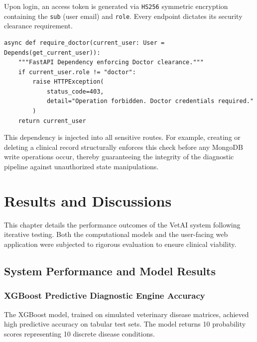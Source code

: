 \documentclass[a4paper,12pt]{report}
\begin{document}
Upon login, an access token is generated via \texttt{HS256} symmetric encryption containing the \texttt{sub} (user email) and \texttt{role}. Every endpoint dictates its security clearance requirement.

\begin{lstlisting}[caption={JWT Dependency Verification Example}]
async def require_doctor(current_user: User = Depends(get_current_user)):
    """FastAPI Dependency enforcing Doctor clearance."""
    if current_user.role != "doctor":
        raise HTTPException(
            status_code=403, 
            detail="Operation forbidden. Doctor credentials required."
        )
    return current_user
\end{lstlisting}

This dependency is injected into all sensitive routes. For example, creating or deleting a clinical record structurally enforces this check before any MongoDB write operations occur, thereby guaranteeing the integrity of the diagnostic pipeline against unauthorized state manipulations.


\chapter{Results and Discussions}

This chapter details the performance outcomes of the VetAI system following iterative testing. Both the computational models and the user-facing web application were subjected to rigorous evaluation to ensure clinical viability.

\section{System Performance and Model Results}

\subsection{XGBoost Predictive Diagnostic Engine Accuracy}

The XGBoost model, trained on simulated veterinary disease matrices, achieved high predictive accuracy on tabular test sets. The model returns 10 probability scores representing 10 discrete disease conditions. 
\end{document}
